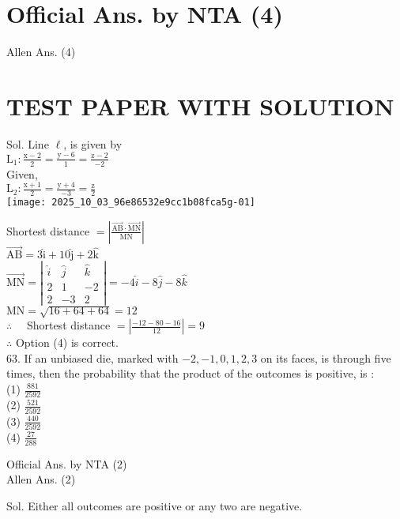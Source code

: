 \documentclass[10pt]{article}
\begin{document}
\section*{Official Ans. by NTA (4)}
Allen Ans. (4)

\section*{TEST PAPER WITH SOLUTION}
Sol. Line \(\ell\), is given by\\
\(\mathrm{L}_{1}: \frac{\mathrm{x}-2}{2}=\frac{\mathrm{y}-6}{1}=\frac{\mathrm{z}-2}{-2}\)\\
Given,\\
\(\mathrm{L}_{2}: \frac{\mathrm{x}+1}{2}=\frac{\mathrm{y}+4}{-3}=\frac{\mathrm{z}}{2}\)\\
\texttt{[image: 2025\_10\_03\_96e86532e9cc1b08fca5g-01]}

Shortest distance \(=\left|\frac{\overrightarrow{\mathrm{AB}} \cdot \overrightarrow{\mathrm{MN}}}{\mathrm{MN}}\right|\)\\
\(\overrightarrow{\mathrm{AB}}=3 \hat{\mathrm{i}}+10 \hat{\mathrm{j}}+2 \hat{\mathrm{k}}\)\\
\(\overrightarrow{\mathrm{MN}}=\left|\begin{array}{ccc}\hat{i} & \hat{j} & \hat{k} \\ 2 & 1 & -2 \\ 2 & -3 & 2\end{array}\right|=-4 \hat{i}-8 \hat{j}-8 \hat{k}\)\\
\(\mathrm{MN}=\sqrt{16+64+64}=12\)\\
\(\therefore \quad\) Shortest distance \(=\left|\frac{-12-80-16}{12}\right|=9\)\\
\(\therefore\) Option (4) is correct.\\
63. If an unbiased die, marked with \(-2,-1,0,1,2,3\) on its faces, is through five times, then the probability that the product of the outcomes is positive, is :\\
(1) \(\frac{881}{2592}\)\\
(2) \(\frac{521}{2592}\)\\
(3) \(\frac{440}{2592}\)\\
(4) \(\frac{27}{288}\)

Official Ans. by NTA (2)\\
Allen Ans. (2)

Sol. Either all outcomes are positive or any two are negative.
\end{document}
